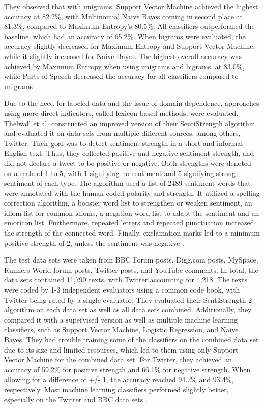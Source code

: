 They observed that with unigrams, Support Vector Machine achieved the highest accuracy at 82.2\%, with Multinomial Naive Bayes coming in second place at 81.3\%, compared to Maximum Entropy's 80.5\%. All classifiers outperformed the baseline, which had an accuracy of 65.2\%. When bigrams were evaluated, the accuracy slightly decreased for Maximum Entropy and Support Vector Machine, while it slightly increased for Naive Bayes. The highest overall accuracy was achieved by Maximum Entropy when using unigrams and bigrams, at 83.0\%, while Parts of Speech decreased the accuracy for all classifiers compared to unigrams \cite{GoBHaHua2009}. 

Due to the need for labeled data and the issue of domain dependence, approaches using more direct indicators, called lexicon-based methods, were evaluated. Thelwall et al. constructed an improved version of their SentiStrength algorithm and evaluated it on data sets from multiple different sources, among others, Twitter. Their goal was to detect sentiment strength in a short and informal English text. Thus, they collected positive and negative sentiment strength, and did not declare a tweet to be positive or negative. Both strengths were denoted on a scale of 1 to 5, with 1 signifying no sentiment and 5 signifying strong sentiment of each type. The algorithm used a list of 2489 sentiment words that were annotated with the human-coded polarity and strength. It utilized a spelling correction algorithm, a booster word list to strengthen or weaken sentiment, an idiom list for common idioms, a negation word list to adapt the sentiment and an emoticon list. Furthermore, repeated letters and repeated punctuation increased the strength of the connected word. Finally, exclamation marks led to a minimum positive strength of 2, unless the sentiment was negative \cite{10.1002/asi.21662}.

The test data sets were taken from BBC Forum posts, Digg.com posts, MySpace, Runners World forum posts, Twitter posts, and YouTube comments. In total, the data sets contained 11,790 texts, with Twitter accounting for 4,218. The texts were coded by 1-3 independent evaluators using a common code book, with Twitter being rated by a single evaluator. They evaluated their SentiStrength 2 algorithm on each data set as well as all data sets combined. Additionally, they compared it with a supervised version as well as multiple machine learning classifiers, such as Support Vector Machine, Logistic Regression, and Naive Bayes. They had trouble training some of the classifiers on the combined data set due to its size and limited resources, which led to them using only Support Vector Machine for the combined data set. For Twitter, they achieved an accuracy of 59.2\% for positive strength and 66.1\% for negative strength. When allowing for a difference of +/- 1, the accuracy reached 94.2\% and 93.4\%, respectively. Most machine learning classifiers performed slightly better, especially on the Twitter and BBC data sets \cite{10.1002/asi.21662}.

